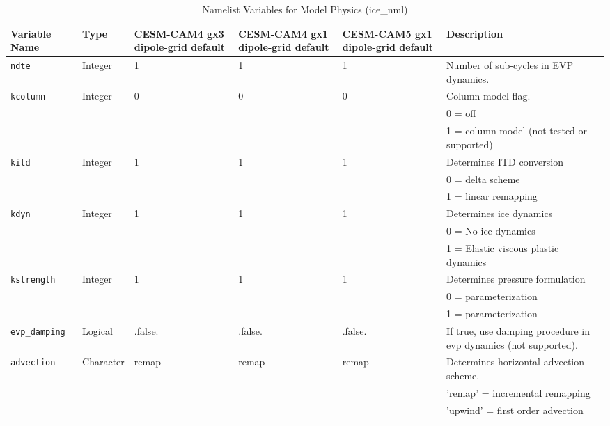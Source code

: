 \begin{table}[hb]
  \begin{center}
  \caption{Namelist Variables for Model Physics (ice_nml)}
  \label{ice_nml}
  \begin{tabular}{p{3cm}p{2cm}p{3cm}p{3cm}p{3cm}p{6.5cm}} \hline
  Variable Name & Type & CESM-CAM4 gx3 dipole-grid default & CESM-CAM4 gx1 dipole-grid default & CESM-CAM5 gx1 dipole-grid default & Description              \\
\hline \hline

{\tt ndte} & Integer & 1 & 1 & 1 & Number of sub-cycles in EVP dynamics. \\

{\tt kcolumn} &  Integer & 0 & 0 & 0 & Column model flag. \\
              &          &   &   &   & 0 = off  \\
              &          &   &   &   & 1 = column model (not tested or supported)\\

{\tt kitd} &  Integer & 1 & 1 & 1 & Determines ITD conversion \\
           &          &   &   &   & 0 = delta scheme \\
           &          &   &   &   & 1 = linear remapping \\

{\tt kdyn} &  Integer & 1 & 1 & 1 & Determines ice dynamics \\
           &          &   &   &   & 0 = No ice dynamics\\
           &          &   &   &   & 1 = Elastic viscous plastic dynamics\\

{\tt kstrength} &  Integer & 1 & 1 & 1 & Determines pressure formulation \\
                &          &   &   &   & 0 = \cite{hibl79} parameterization \\
                &          &   &   &   & 1 = \cite{roth75b} parameterization \\

{\tt evp\_damping} &  Logical & .false. & .false. & .false. & If true, use damping procedure
                                             in evp dynamics (not supported). \\

{\tt advection} &  Character & remap & remap & remap & Determines horizontal
                                               advection scheme. \\
                &            &       &       &       & 'remap' = incremental remapping \\
                &            &       &       &       & 'upwind' = first order advection \\


\end{tabular}
\end{center}
\end{table}
